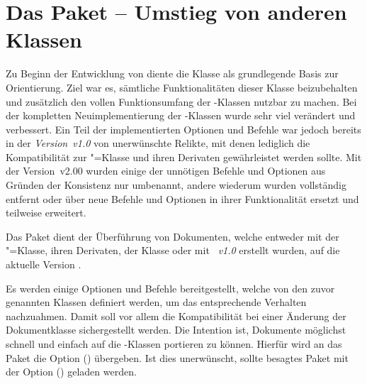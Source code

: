 \section{Das Paket  -- Umstieg von anderen Klassen}
\begin{Bundle*}{}
%
%

\noindent{}

\bigskip\noindent
Zu Beginn der Entwicklung von \TUDScript diente die Klasse  als 
grundlegende Basis zur Orientierung. Ziel war es, sämtliche Funktionalitäten 
dieser Klasse beizubehalten und zusätzlich den vollen Funktionsumfang der 
\KOMAScript-Klassen nutzbar zu machen. Bei der kompletten Neuimplementierung 
der \TUDScript-Klassen wurde sehr viel verändert und verbessert. Ein Teil der 
implementierten Optionen und Befehle war jedoch bereits in der 
\emph{Version~v1.0} von \TUDScript unerwünschte Relikte, mit denen lediglich 
die Kompatibilität zur "=Klasse und ihren Derivaten 
gewährleistet werden sollte. Mit der Version~v2.00 wurden einige der unnötigen 
Befehle und Optionen aus Gründen der Konsistenz nur umbenannt, andere wiederum 
wurden vollständig entfernt oder über neue Befehle und Optionen in ihrer 
Funktionalität ersetzt und teilweise erweitert. 

Das Paket  dient der Überführung von Dokumenten, welche
entweder mit der "=Klasse, ihren Derivaten, 
der Klasse  oder mit \emph{\TUDScript~v1.0} 
erstellt wurden, auf die aktuelle Version \TUDScriptVersion. 

Es werden einige Optionen und Befehle bereitgestellt, welche von den zuvor 
genannten Klassen definiert werden, um das entsprechende Verhalten nachzuahmen. 
Damit soll vor allem die Kompatibilität bei einer Änderung der Dokumentklasse 
sichergestellt werden. Die Intention ist, Dokumente möglichst schnell und 
einfach auf die \TUDScript-Klassen portieren zu können. Hierfür wird an das 
Paket  die Option ()
übergeben. Ist dies unerwünscht, sollte besagtes Paket mit der Option 
() geladen werden.


\end{Bundle*}
